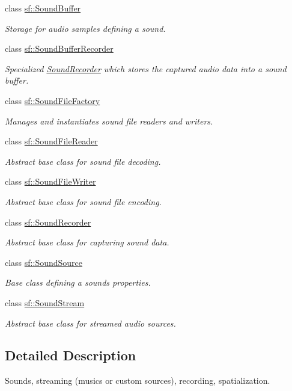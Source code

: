\begin{DoxyCompactItemize}
class \hyperlink{classsf_1_1_sound_buffer}{sf\+::\+Sound\+Buffer}
\begin{DoxyCompactList}\small\item\em Storage for audio samples defining a sound. \end{DoxyCompactList}\item 
class \hyperlink{classsf_1_1_sound_buffer_recorder}{sf\+::\+Sound\+Buffer\+Recorder}
\begin{DoxyCompactList}\small\item\em Specialized \hyperlink{classsf_1_1_sound_recorder}{Sound\+Recorder} which stores the captured audio data into a sound buffer. \end{DoxyCompactList}\item 
class \hyperlink{classsf_1_1_sound_file_factory}{sf\+::\+Sound\+File\+Factory}
\begin{DoxyCompactList}\small\item\em Manages and instantiates sound file readers and writers. \end{DoxyCompactList}\item 
class \hyperlink{classsf_1_1_sound_file_reader}{sf\+::\+Sound\+File\+Reader}
\begin{DoxyCompactList}\small\item\em Abstract base class for sound file decoding. \end{DoxyCompactList}\item 
class \hyperlink{classsf_1_1_sound_file_writer}{sf\+::\+Sound\+File\+Writer}
\begin{DoxyCompactList}\small\item\em Abstract base class for sound file encoding. \end{DoxyCompactList}\item 
class \hyperlink{classsf_1_1_sound_recorder}{sf\+::\+Sound\+Recorder}
\begin{DoxyCompactList}\small\item\em Abstract base class for capturing sound data. \end{DoxyCompactList}\item 
class \hyperlink{classsf_1_1_sound_source}{sf\+::\+Sound\+Source}
\begin{DoxyCompactList}\small\item\em Base class defining a sound\textquotesingle{}s properties. \end{DoxyCompactList}\item 
class \hyperlink{classsf_1_1_sound_stream}{sf\+::\+Sound\+Stream}
\begin{DoxyCompactList}\small\item\em Abstract base class for streamed audio sources. \end{DoxyCompactList}\end{DoxyCompactItemize}


\subsection{Detailed Description}
Sounds, streaming (musics or custom sources), recording, spatialization. 